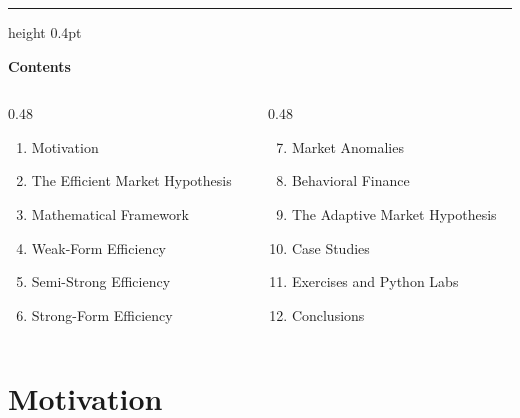 \documentclass[9pt, aspectratio=169, t]{beamer}
\theoremstyle{definition}
\begin{document}
{
\begin{frame}{}
    {\color{FooterGray}\hrule height 0.4pt}
    \vspace{0.1cm}
    {\Large\textcolor{IDAred}{\textbf{Contents}}}
    \vspace{0.2cm}
    {\small
    \begin{columns}[T]
        \begin{column}{0.48\textwidth}
            \begin{enumerate}
                \item Motivation
                \item The Efficient Market Hypothesis
                \item Mathematical Framework
                \item Weak-Form Efficiency
                \item Semi-Strong Efficiency
                \item Strong-Form Efficiency
            \end{enumerate}
        \end{column}
        \begin{column}{0.48\textwidth}
            \begin{enumerate}\setcounter{enumi}{6}
                \item Market Anomalies
                \item Behavioral Finance
                \item The Adaptive Market Hypothesis
                \item Case Studies
                \item Exercises and Python Labs
                \item Conclusions
            \end{enumerate}
        \end{column}
    \end{columns}
    }
\end{frame}
}

\section{Motivation}
\end{document}
